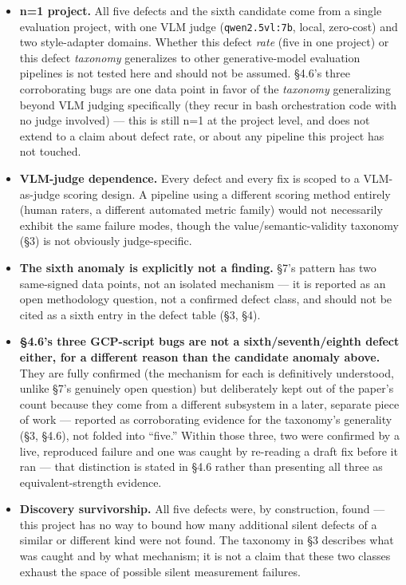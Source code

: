 \begin{itemize}
\tightlist
\item
  \textbf{n=1 project.} All five defects and the sixth candidate come
  from a single evaluation project, with one VLM judge
  (\texttt{qwen2.5vl:7b}, local, zero-cost) and two style-adapter
  domains. Whether this defect \emph{rate} (five in one project) or this
  defect \emph{taxonomy} generalizes to other generative-model
  evaluation pipelines is not tested here and should not be assumed.
  §4.6's three corroborating bugs are one data point in favor of the
  \emph{taxonomy} generalizing beyond VLM judging specifically (they
  recur in bash orchestration code with no judge involved) --- this is
  still n=1 at the project level, and does not extend to a claim about
  defect rate, or about any pipeline this project has not touched.
\item
  \textbf{VLM-judge dependence.} Every defect and every fix is scoped to
  a VLM-as-judge scoring design. A pipeline using a different scoring
  method entirely (human raters, a different automated metric family)
  would not necessarily exhibit the same failure modes, though the
  value/semantic-validity taxonomy (§3) is not obviously judge-specific.
\item
  \textbf{The sixth anomaly is explicitly not a finding.} §7's pattern
  has two same-signed data points, not an isolated mechanism --- it is
  reported as an open methodology question, not a confirmed defect
  class, and should not be cited as a sixth entry in the defect table
  (§3, §4).
\item
  \textbf{§4.6's three GCP-script bugs are not a sixth/seventh/eighth
  defect either, for a different reason than the candidate anomaly
  above.} They are fully confirmed (the mechanism for each is
  definitively understood, unlike §7's genuinely open question) but
  deliberately kept out of the paper's count because they come from a
  different subsystem in a later, separate piece of work --- reported as
  corroborating evidence for the taxonomy's generality (§3, §4.6), not
  folded into ``five.'' Within those three, two were confirmed by a
  live, reproduced failure and one was caught by re-reading a draft fix
  before it ran --- that distinction is stated in §4.6 rather than
  presenting all three as equivalent-strength evidence.
\item
  \textbf{Discovery survivorship.} All five defects were, by
  construction, found --- this project has no way to bound how many
  additional silent defects of a similar or different kind were not
  found. The taxonomy in §3 describes what was caught and by what
  mechanism; it is not a claim that these two classes exhaust the space
  of possible silent measurement failures.
\end{itemize}

